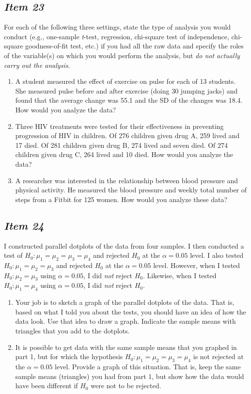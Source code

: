 \subsection{\textbf{\textit{Item 23}}}
For each of the following three settings, state the type of analysis you would conduct (e.g., one-sample \textit{t}-test, regression, chi-square test of independence, chi-square goodness-of-fit test, etc.) if you had all the raw data and specify the roles of the variable(s) on which you would perform the analysis, but \textit{do not actually carry out the analysis}.
\begin{enumerate}[leftmargin=1cm, itemsep=.2em]
\item A student measured the effect of exercise on pulse for each of 13 students.  She measured pulse before and after exercise (doing 30 jumping jacks) and found that the average change was 55.1 and the SD of the changes was 18.4.  How would you analyze the data?
\item Three HIV treatments were tested for their effectiveness in preventing progression of HIV in children.  Of 276 children given drug A, 259 lived and 17 died. Of 281 children given drug B, 274 lived and seven died.  Of 274 children given drug C, 264 lived and 10 died.  How would you analyze the data?
\item A researcher was interested in the relationship between blood pressure and physical activity.
He measured the blood pressure and weekly total number of steps from a Fitbit for 125 women.
How would you analyze these data?
\end{enumerate}

\subsection{\textbf{\textit{Item 24}}}
I constructed
parallel dotplots of the data from four samples.  I then conducted a test of $H_0: \mu_1=\mu_2=\mu_3=\mu_4$ and rejected $H_0$ at the $\alpha = 0.05$ level.  I also tested $H_0: \mu_1=\mu_2=\mu_3$ and rejected $H_0$ at the $\alpha = 0.05$ level.  However, when I tested $H_0: \mu_2=\mu_3$ using $\alpha = 0.05$, I did \textit{not} reject $H_0$.  Likewise, when I tested $H_0: \mu_1=\mu_4$ using $\alpha = 0.05$, I did \textit{not} reject $H_0$.
\begin{enumerate}[leftmargin=1cm, itemsep=.2em]
\item Your job is to sketch a graph of the parallel dotplots of the data. That is, based on what I told you about the tests, you should have an idea of how the data look. Use that idea to draw a graph.  Indicate the sample means with triangles that you add to the dotplots.
\item It is possible to get data with the same sample means that you graphed in part 1, but for which the hypothesis $H_0: \mu_1=\mu_2=\mu_3=\mu_4$ is not rejected at the $\alpha = 0.05$ level.  Provide a graph of this situation.  That is, keep the same sample means (triangles) you had from part 1, but show how the data would have been different if $H_0$ were not to be rejected.
\end{enumerate}

